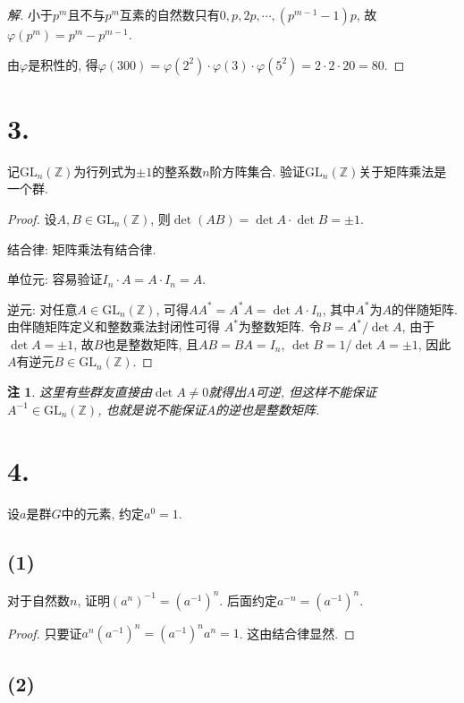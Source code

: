\documentclass[12pt, a4paper, fontset=windows]{ctexart}
\newcommand{\Z}{\mathbb{Z}}
\newcommand{\GL}{\mathrm{GL}}
\newtheorem*{remark}{注}
\newenvironment{solution}{\begin{proof}[解]}{\end{proof}}
\begin{document}
\begin{solution}
小于$p^m$且不与$p^m$互素的自然数只有$0,p,2p,\cdots,(p^{m-1}-1)p$, 
故$\varphi(p^m)=p^m-p^{m-1}$. 

由$\varphi$是积性的, 得$\varphi(300)=\varphi(2^2)\cdot\varphi(3)\cdot\varphi(5^2)
=2\cdot 2\cdot 20=80$. 
\end{solution}

\section*{3.}

记$\GL_n(\Z)$为行列式为$\pm 1$的整系数$n$阶方阵集合. 
验证$\GL_n(\Z)$关于矩阵乘法是一个群. 

\begin{proof}
设$A,B\in\GL_n(\Z)$, 则$\det(AB)=\det A\cdot\det B=\pm 1$.

结合律: 
矩阵乘法有结合律. 

单位元: 
容易验证$I_n\cdot A=A\cdot I_n=A$. 

逆元: 
对任意$A\in\GL_n(\Z)$, 可得$AA^*=A^*A=\det A\cdot I_n$, 
其中$A^*$为$A$的伴随矩阵. 由伴随矩阵定义和整数乘法封闭性可得
$A^*$为整数矩阵. 令$B=A^*/\det A$, 由于$\det A=\pm 1$, 
故$B$也是整数矩阵, 且$AB=BA=I_n$, $\det B=1/\det A=\pm 1$, 
因此$A$有逆元$B\in\GL_n(\Z)$. 
\end{proof}

\begin{remark}
这里有些群友直接由$\det A\ne 0$就得出$A$可逆, 
但这样不能保证$A^{-1}\in\GL_n(\Z)$, 
也就是说不能保证$A$的逆也是整数矩阵. 
\end{remark}

\section*{4.}

设$a$是群$G$中的元素, 约定$a^0=1$. 

\subsection*{(1)}

对于自然数$n$, 证明$(a^n)^{-1}=(a^{-1})^n$. 
后面约定$a^{-n}=(a^{-1})^n$. 

\begin{proof}
只要证$a^n(a^{-1})^n=(a^{-1})^na^n=1$. 这由结合律显然. 
\end{proof}

\subsection*{(2)}
\end{document}

